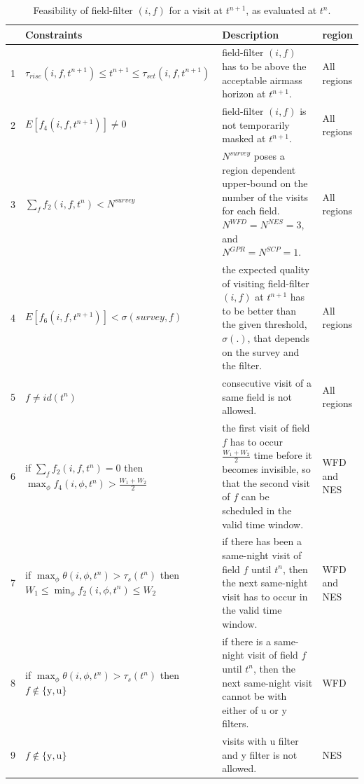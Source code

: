 \documentclass[12pt]{aastex62}
\theoremstyle{definition}
\begin{document}
\begin{table}
\caption{Feasibility of field-filter $(i,f)$ for a visit at $t^{n+1}$, as evaluated at $t^n$.}
\begin{tabularx}{\textwidth}{| l | X | X | l |}
\hline
& Constraints& Description & region\\ \hline \hline

1&$ \tau_{rise}(i,f,t^{n+1}) \leq t^{n+1} \leq \tau_{set}(i,f,t^{n+1}) $ & field-filter $(i,f)$ has to be above the acceptable airmass horizon at $t^{n+1}.$ & All regions\\ \hline

2&$ E[f_4(i,f,t^{n+1})] \neq 0 $ & field-filter $(i,f)$ is not temporarily masked at $t^{n+1}$. & All regions\\ \hline

3 & $\sum_{f}f_2(i,f,t^n) < N^{\textit{survey}}$ & $N^{\textit{survey}}$ poses a region dependent upper-bound on the number of the visits for each field. $N^{WFD}= N^{NES} = 3$, and $N^{GPR}= N^{SCP} = 1.$ & All regions\\ \hline

4 & $E[f_6(i,f,t^{n+1})] < \sigma({\textit{survey},f})$ & the expected quality of visiting field-filter $(i,f)$ at $t^{n+1}$ has to be better than the given threshold, $\sigma(.)$, that depends on the survey and the filter. & All regions\\ \hline

5&$f \neq id(t^n)$ & consecutive visit of a same field is not allowed. & All regions\\ \hline

6& if $\sum_{f}f_2(i,f,t^n) = 0$ then \newline $\max_\phi f_4(i,\phi,t^n) > \frac{W_1+W_2}{2}$ & the first visit of field $f$ has to occur $\frac{W_1+W_2}{2}$ time before it becomes invisible, so that the second visit of $f$ can be scheduled in the valid time window. & WFD and NES\\ \hline

7& if $\max_{\phi}\theta(i,\phi,t^n) > \tau_s(t^n)$ then \newline $ W_1 \leq \min_{\phi}f_2(i,\phi,t^n) \leq W_2 $& if there has been a same-night visit of field $f$ until $t^n$, then the next same-night visit has to occur in the valid time window. & WFD and NES\\ \hline

8&if \newline $\max_{\phi}\theta(i,\phi,t^n) > \tau_s(t^n)$ then \newline $f \notin \{\text{y},\text{u}\}$& if there is a same-night visit of field $f$ until $t^n$, then the next same-night visit cannot be with either of u or y filters. & WFD\\ \hline

9& $f \notin \{\text{y},\text{u}\}$ & visits with u filter and y filter is not allowed. & NES\\ \hline

\end{tabularx}
\end{table}\label{tab_feasibility}
\end{document}
